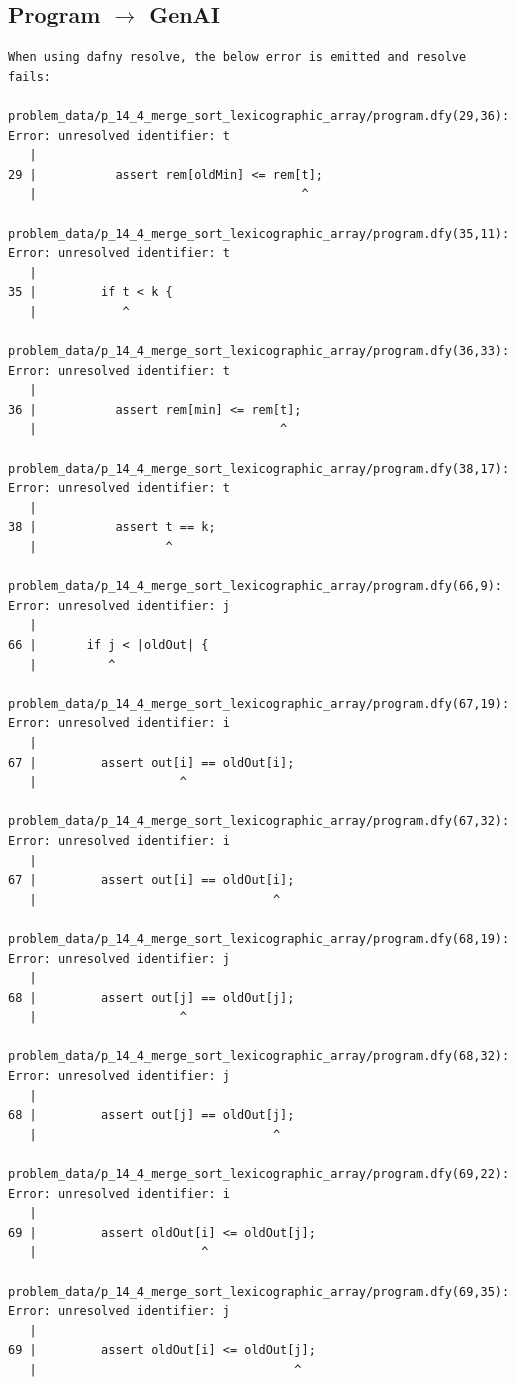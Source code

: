 \documentclass{article}
\begin{document}
\subsection*{Program $\rightarrow$ GenAI}
\begin{lstlisting}
When using dafny resolve, the below error is emitted and resolve fails:

problem_data/p_14_4_merge_sort_lexicographic_array/program.dfy(29,36): Error: unresolved identifier: t
   |
29 |           assert rem[oldMin] <= rem[t];
   |                                     ^

problem_data/p_14_4_merge_sort_lexicographic_array/program.dfy(35,11): Error: unresolved identifier: t
   |
35 |         if t < k {
   |            ^

problem_data/p_14_4_merge_sort_lexicographic_array/program.dfy(36,33): Error: unresolved identifier: t
   |
36 |           assert rem[min] <= rem[t];
   |                                  ^

problem_data/p_14_4_merge_sort_lexicographic_array/program.dfy(38,17): Error: unresolved identifier: t
   |
38 |           assert t == k;
   |                  ^

problem_data/p_14_4_merge_sort_lexicographic_array/program.dfy(66,9): Error: unresolved identifier: j
   |
66 |       if j < |oldOut| {
   |          ^

problem_data/p_14_4_merge_sort_lexicographic_array/program.dfy(67,19): Error: unresolved identifier: i
   |
67 |         assert out[i] == oldOut[i];
   |                    ^

problem_data/p_14_4_merge_sort_lexicographic_array/program.dfy(67,32): Error: unresolved identifier: i
   |
67 |         assert out[i] == oldOut[i];
   |                                 ^

problem_data/p_14_4_merge_sort_lexicographic_array/program.dfy(68,19): Error: unresolved identifier: j
   |
68 |         assert out[j] == oldOut[j];
   |                    ^

problem_data/p_14_4_merge_sort_lexicographic_array/program.dfy(68,32): Error: unresolved identifier: j
   |
68 |         assert out[j] == oldOut[j];
   |                                 ^

problem_data/p_14_4_merge_sort_lexicographic_array/program.dfy(69,22): Error: unresolved identifier: i
   |
69 |         assert oldOut[i] <= oldOut[j];
   |                       ^

problem_data/p_14_4_merge_sort_lexicographic_array/program.dfy(69,35): Error: unresolved identifier: j
   |
69 |         assert oldOut[i] <= oldOut[j];
   |                                    ^


\end{lstlisting}
\end{document}

